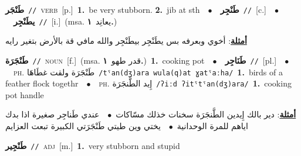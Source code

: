 \documentclass[10pt,a4paper,twoside]{article} %
\begin{document}
\begin{multicols}{2}
{\setlength\topsep{0pt}\textbf{\foreignlanguage{arabic}{طَنْجَر}}\ {\color{gray}\texttt{//}\color{black}}\ \textsc{verb}\ [p.]\ \textbf{1.}~be very stubborn.  \textbf{2.}~jib at sth\ \ $\bullet$\ \ \setlength\topsep{0pt}\textbf{\foreignlanguage{arabic}{طَنْجِر}}\ {\color{gray}\texttt{//}\color{black}}\ [c.]\ \ $\bullet$\ \ \setlength\topsep{0pt}\textbf{\foreignlanguage{arabic}{يطَنْجِر}}\ {\color{gray}\texttt{//}\color{black}}\ [i.]\ \color{gray}(msa. \foreignlanguage{arabic}{يعانِد}~\foreignlanguage{arabic}{\textbf{١.}})\color{black}\  \begin{flushright}\color{gray}\foreignlanguage{arabic}{\textbf{\underline{\foreignlanguage{arabic}{أمثلة}}}: أخوي وبعرفه بس يطَنْجِر بيطَنْجِر والله مافي قة بالأرض بتغير رايه}\end{flushright}\color{black}} \vspace{2mm}

{\setlength\topsep{0pt}\textbf{\foreignlanguage{arabic}{طَنْجَرَة}}\ {\color{gray}\texttt{//}\color{black}}\ \textsc{noun}\ [f.]\ \color{gray}(msa. \foreignlanguage{arabic}{قدر طهو}~\foreignlanguage{arabic}{\textbf{١.}})\color{black}\ \textbf{1.}~cooking pot\ \ $\bullet$\ \ \setlength\topsep{0pt}\textbf{\foreignlanguage{arabic}{طَنَاجِر}}\ {\color{gray}\texttt{//}\color{black}}\ [pl.]\ \ $\bullet$\ \ \textsc{ph.} \color{gray} \foreignlanguage{arabic}{طَنْجَرَة ولقت غطَاهَا}\color{black}\ {\color{gray}\texttt{/{\sffamily tˤan(dʒ)ara wula(q)at ɣatˤaːha}/}\color{black}}\ \textbf{1.}~birds of a feather flock togethr\ \ $\bullet$\ \ \textsc{ph.} \color{gray} \foreignlanguage{arabic}{إِيد الطَّنجَرَة}\color{black}\ {\color{gray}\texttt{/{\sffamily ʔiːd ʔitˤtˤan(dʒ)ara}/}\color{black}}\ \textbf{1.}~cooking pot handle\  \begin{flushright}\color{gray}\foreignlanguage{arabic}{\textbf{\underline{\foreignlanguage{arabic}{أمثلة}}}: دير بالك إِيدين الطَّنجَرَة سخنات خذلك مسّاكات\ $\bullet$\ \  عندي طَناجِر صغيرة اذا بدك اياهم للمرة الوحدانية\ $\bullet$\ \  يختي وين طيتي طَنْجَرَتي الكبيرة تبعت العزايم}\end{flushright}\color{black}} \vspace{2mm}

{\setlength\topsep{0pt}\textbf{\foreignlanguage{arabic}{طَنْجِير}}\ {\color{gray}\texttt{//}\color{black}}\ \textsc{adj}\ [m.]\ \textbf{1.}~very stubborn and stupid\ } \vspace{2mm}


\end{multicols}
\end{document}

